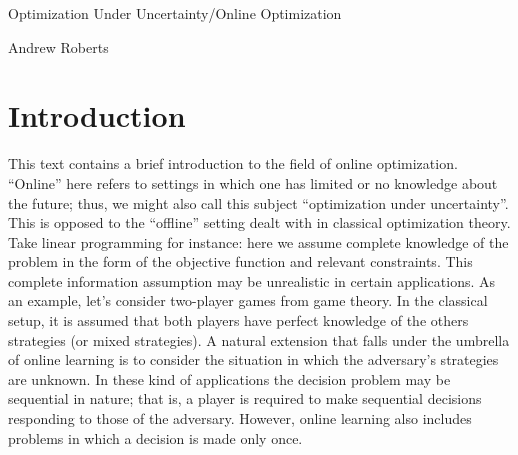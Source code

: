 \documentclass[12pt]{article}
\begin{document}
\begin{center}
\Large
Optimization Under Uncertainty/Online Optimization
\end{center}

\begin{flushright}
Andrew Roberts
\end{flushright} 

\section{Introduction}
This text contains a brief introduction to the field of online optimization. ``Online'' here refers to settings in which one has limited or no knowledge about the future; thus, we might 
also call this subject ``optimization under uncertainty''. This is opposed to the ``offline'' setting dealt with in classical optimization theory. Take linear programming for instance: here we
assume complete knowledge of the problem in the form of the objective function and relevant constraints. This complete information assumption may be unrealistic in certain applications. 
As an example, let's consider two-player games from game theory. In the classical setup, it is assumed that both players have perfect knowledge of the others strategies (or mixed strategies). 
A natural extension that falls under the umbrella of online learning is to consider the situation in which the adversary's strategies are unknown. In these kind of applications the decision problem 
may be sequential in nature; that is, a player is required to make sequential decisions responding to those of the adversary. However, online learning also includes problems in which a decision is 
made only once. 
\end{document}

